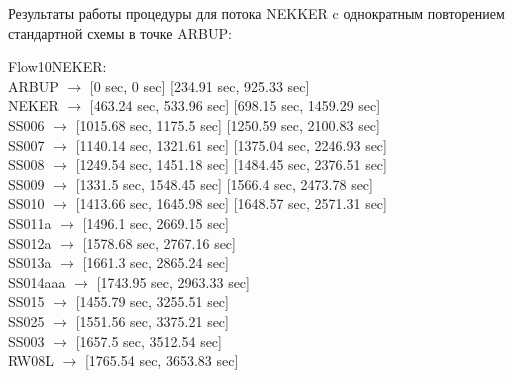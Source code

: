 \documentclass[12pt, a4 paper]{article}
\begin{document}
Результаты работы процедуры для потока NEKKER c однократным повторением стандартной схемы в точке ARBUP:

\noindent Flow10NEKER:\\
ARBUP $\rightarrow$ [0 sec, 0 sec] [234.91 sec, 925.33 sec]\\
NEKER $\rightarrow$ [463.24 sec, 533.96 sec] [698.15 sec, 1459.29 sec]\\
SS006 $\rightarrow$ [1015.68 sec, 1175.5 sec] [1250.59 sec, 2100.83 sec]\\
SS007 $\rightarrow$ [1140.14 sec, 1321.61 sec] [1375.04 sec, 2246.93 sec]\\
SS008 $\rightarrow$ [1249.54 sec, 1451.18 sec] [1484.45 sec, 2376.51 sec]\\
SS009 $\rightarrow$ [1331.5 sec, 1548.45 sec] [1566.4 sec, 2473.78 sec]\\
SS010 $\rightarrow$ [1413.66 sec, 1645.98 sec] [1648.57 sec, 2571.31 sec]\\
SS011a $\rightarrow$ [1496.1 sec, 2669.15 sec]\\
SS012a $\rightarrow$ [1578.68 sec, 2767.16 sec]\\
SS013a $\rightarrow$ [1661.3 sec, 2865.24 sec]\\
SS014aaa $\rightarrow$ [1743.95 sec, 2963.33 sec]\\
SS015 $\rightarrow$ [1455.79 sec, 3255.51 sec]\\
SS025 $\rightarrow$ [1551.56 sec, 3375.21 sec]\\
SS003 $\rightarrow$ [1657.5 sec, 3512.54 sec]\\
RW08L $\rightarrow$ [1765.54 sec, 3653.83 sec]\\
\end{document}
